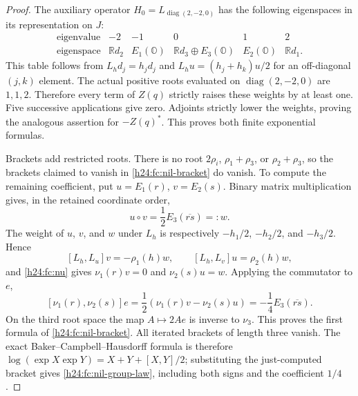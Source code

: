 \begin{proof}
The auxiliary operator $H_0=L_{\operatorname{diag}(2,-2,0)}$ has
the following eigenspaces in its representation on $J$:
\[
 \begin{array}{c|ccccc}
 \text{eigenvalue}&-2&-1&0&1&2\\ \hline
 \text{eigenspace}&\mathbb R d_2&E_1(\mathbb O)&
 \mathbb R d_3\oplus E_3(\mathbb O)&E_2(\mathbb O)&\mathbb R d_1.
 \end{array}
\]
This table follows from
$L_h d_j=h_jd_j$ and
$L_hu=(h_j+h_k)u/2$ for an off-diagonal $(j,k)$ element.
The actual positive roots evaluated on $\operatorname{diag}(2,-2,0)$
are $1,1,2$. Therefore every term of $Z(q)$ strictly raises these
weights by at least one. Five successive applications give zero.
Adjoints strictly lower the weights, proving the analogous assertion
for $-Z(q)^*$. This proves both finite exponential formulas.

Brackets add restricted roots. There is no root $2\rho_i$,
$\rho_1+\rho_3$, or $\rho_2+\rho_3$, so the brackets claimed to
vanish in \eqref{h24:fc:nil-bracket} do vanish. To compute the
remaining coefficient, put $u=E_1(r)$, $v=E_2(s)$. Binary matrix
multiplication gives, in the retained coordinate order,
\[
 u\circ v=\frac12E_3(\overline{rs})=:w.
\]
The weight of $u$, $v$, and $w$ under $L_h$ is respectively
$-h_1/2$, $-h_2/2$, and $-h_3/2$. Hence
\[
 [L_h,L_u]v=-\rho_1(h)w,\qquad
 [L_h,L_v]u=\rho_2(h)w,
\]
and \eqref{h24:fc:nu} gives
$\nu_1(r)v=0$ and $\nu_2(s)u=w$. Applying the commutator to $e$,
\[
 [\nu_1(r),\nu_2(s)]e
       =\frac12(\nu_1(r)v-\nu_2(s)u)
       =-\frac14E_3(\overline{rs}).
\]
On the third root space the map $A\mapsto2Ae$ is inverse to $\nu_3$.
This proves the first formula of \eqref{h24:fc:nil-bracket}.
All iterated brackets of length three vanish. The exact
Baker--Campbell--Hausdorff formula is therefore
$\log(\exp X\exp Y)=X+Y+[X,Y]/2$; substituting the just-computed
bracket gives \eqref{h24:fc:nil-group-law}, including both signs and
the coefficient $1/4$.
\end{proof}

